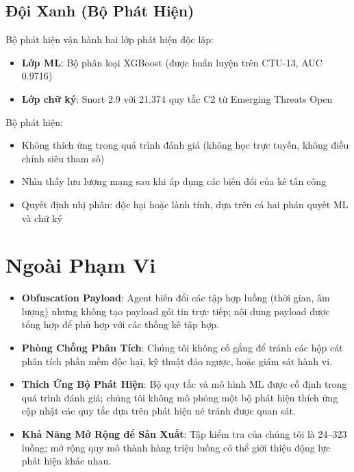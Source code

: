 \documentclass[12pt,a4paper]{report}
\begin{document}
\subsection{Đội Xanh (Bộ Phát Hiện)}
Bộ phát hiện vận hành hai lớp phát hiện độc lập:
\begin{itemize}
  \item \textbf{Lớp ML}: Bộ phân loại XGBoost (được huấn luyện trên CTU-13, AUC 0.9716)
  \item \textbf{Lớp chữ ký}: Snort 2.9 với 21.374 quy tắc C2 từ Emerging Threats Open
\end{itemize}

Bộ phát hiện:
\begin{itemize}
  \item Không thích ứng trong quá trình đánh giá (không học trực tuyến, không điều chỉnh siêu tham số)
  \item Nhìn thấy lưu lượng mạng sau khi áp dụng các biến đổi của kẻ tấn công
  \item Quyết định nhị phân: độc hại hoặc lành tính, dựa trên cả hai phán quyết ML và chữ ký
\end{itemize}

\section{Ngoài Phạm Vi}

\begin{itemize}
  \item \textbf{Obfuscation Payload}: Agent biến đổi các tập hợp luồng (thời gian, âm lượng) nhưng không tạo payload gói tin trực tiếp; nội dung payload được tổng hợp để phù hợp với các thống kê tập hợp.
  
  \item \textbf{Phòng Chống Phân Tích}: Chúng tôi không cố gắng để tránh các hộp cát phân tích phần mềm độc hại, kỹ thuật đảo ngược, hoặc giám sát hành vi.
  
  \item \textbf{Thích Ứng Bộ Phát Hiện}: Bộ quy tắc và mô hình ML được cố định trong quá trình đánh giá; chúng tôi không mô phỏng một bộ phát hiện thích ứng cập nhật các quy tắc dựa trên phát hiện né tránh được quan sát.
  
  \item \textbf{Khả Năng Mở Rộng để Sản Xuất}: Tập kiểm tra của chúng tôi là 24–323 luồng; mở rộng quy mô thành hàng triệu luồng có thể giới thiệu động lực phát hiện khác nhau.
\end{itemize}
\end{document}
